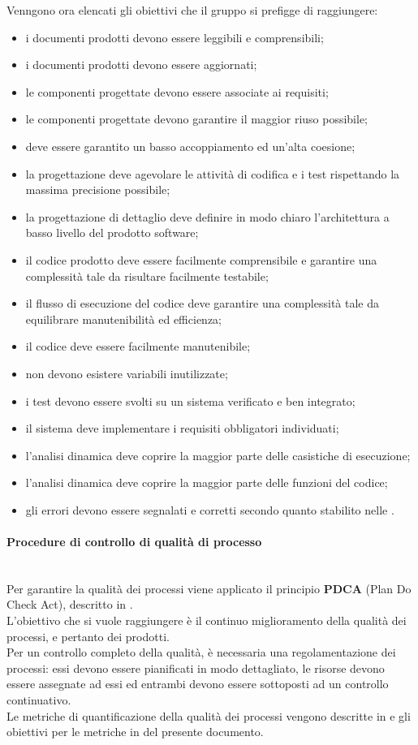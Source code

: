 Venngono ora elencati gli obiettivi che il gruppo si prefigge di raggiungere:
\begin{itemize}
	\item i documenti prodotti devono essere leggibili e comprensibili;
	\item i documenti prodotti devono essere aggiornati;
	\item le componenti progettate devono essere associate ai requisiti;
	\item le componenti progettate devono garantire il maggior riuso possibile;
	\item deve essere garantito un basso accoppiamento ed un'alta coesione;
	\item la progettazione deve agevolare le attività di codifica e i test rispettando la massima precisione possibile;
	\item la progettazione di dettaglio deve definire in modo chiaro l'architettura a basso livello del prodotto software;
	\item il codice prodotto deve essere facilmente comprensibile e garantire una complessità tale da risultare facilmente testabile;
	\item il flusso di esecuzione del codice deve garantire una complessità tale da equilibrare manutenibilità ed efficienza;
	\item il codice deve essere facilmente manutenibile;
	\item non devono esistere variabili inutilizzate;
	\item i test devono essere svolti su un sistema verificato e ben integrato;
	\item il sistema deve implementare i requisiti obbligatori individuati;
	\item l'analisi dinamica deve coprire la maggior parte delle casistiche di esecuzione;
	\item l'analisi dinamica deve coprire la maggior parte delle funzioni del codice;
	\item gli errori devono essere segnalati e corretti secondo quanto stabilito nelle \NormeDiProgetto{}.
\end{itemize}

\paragraph{Procedure di controllo di qualità di processo}\mbox{}\\
Per garantire la qualità dei processi viene applicato il principio \textbf{PDCA} (Plan Do Check Act), descritto in .\\ 
L'obiettivo che si vuole raggiungere è il continuo miglioramento della qualità dei processi, e pertanto dei prodotti.\\
Per un controllo completo della qualità, è necessaria una regolamentazione dei processi: essi devono essere pianificati in modo dettagliato, le risorse devono essere assegnate ad essi ed entrambi devono essere sottoposti ad un controllo continuativo.\\
Le metriche di quantificazione della qualità dei processi vengono descritte in \NormeDiProgetto{} e gli obiettivi per le metriche in  del presente documento.

